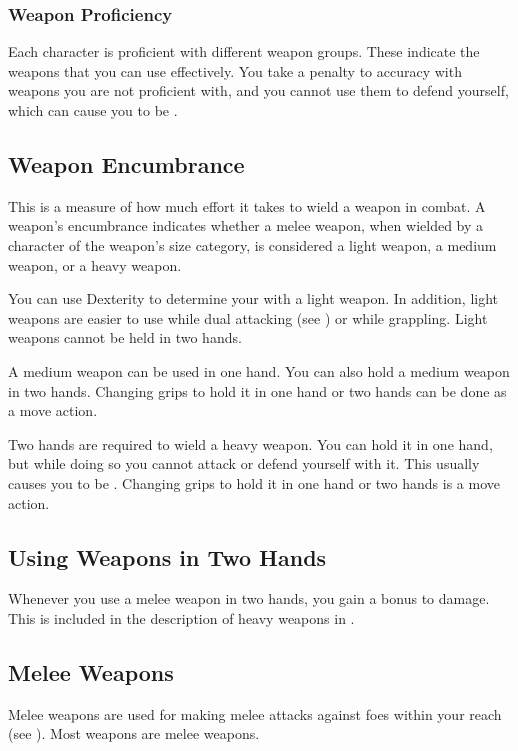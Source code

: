\subsubsection{Weapon Proficiency}\label{Weapon Proficiency}
Each character is proficient with different weapon groups. These indicate the weapons that you can use effectively. You take a  penalty to accuracy with weapons you are not proficient with, and you cannot use them to defend yourself, which can cause you to be .

\subsection{Weapon Encumbrance}
This is a measure of how much effort it takes to wield a weapon in combat. A weapon's encumbrance indicates whether a melee weapon, when wielded by a character of the weapon's size category, is considered a light weapon, a medium weapon, or a heavy weapon.

 You can use Dexterity to determine your  with a light weapon.
In addition, light weapons are easier to use while dual attacking (see ) or while grappling.
Light weapons cannot be held in two hands.

 A medium weapon can be used in one hand. You can also hold a medium weapon in two hands. Changing grips to hold it in one hand or two hands can be done as a move action.

 Two hands are required to wield a heavy weapon. You can hold it in one hand, but while doing so you cannot attack or defend yourself with it. This usually causes you to be . Changing grips to hold it in one hand or two hands is a move action.

\subsection{Using Weapons in Two Hands}
Whenever you use a melee weapon in two hands, you gain a  bonus to damage.
This is included in the description of heavy weapons in .

\subsection{Melee Weapons}
Melee weapons are used for making melee attacks against foes within your reach (see ). Most weapons are melee weapons.

